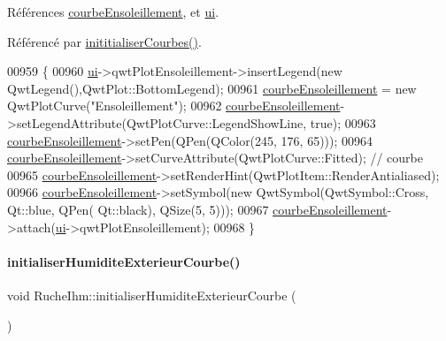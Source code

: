 Références \hyperlink{class_ruche_ihm_af160181f408b3a9519b97e67c810a0fd}{courbe\+Ensoleillement}, et \hyperlink{class_ruche_ihm_a64786058bd7f88ca2f1e9743bb27c25b}{ui}.



Référencé par \hyperlink{class_ruche_ihm_a4fe15b22538611ad9ffc4d807f8b78fd}{inititialiser\+Courbes()}.


\begin{DoxyCode}
00959 \{
00960     \hyperlink{class_ruche_ihm_a64786058bd7f88ca2f1e9743bb27c25b}{ui}->qwtPlotEnsoleillement->insertLegend(\textcolor{keyword}{new} QwtLegend(),QwtPlot::BottomLegend);
00961     \hyperlink{class_ruche_ihm_af160181f408b3a9519b97e67c810a0fd}{courbeEnsoleillement} = \textcolor{keyword}{new} QwtPlotCurve(\textcolor{stringliteral}{"Ensoleillement"});
00962     \hyperlink{class_ruche_ihm_af160181f408b3a9519b97e67c810a0fd}{courbeEnsoleillement}->setLegendAttribute(QwtPlotCurve::LegendShowLine, \textcolor{keyword}{true});
00963     \hyperlink{class_ruche_ihm_af160181f408b3a9519b97e67c810a0fd}{courbeEnsoleillement}->setPen(QPen(QColor(245, 176, 65)));
00964     \hyperlink{class_ruche_ihm_af160181f408b3a9519b97e67c810a0fd}{courbeEnsoleillement}->setCurveAttribute(QwtPlotCurve::Fitted); \textcolor{comment}{// courbe}
00965     \hyperlink{class_ruche_ihm_af160181f408b3a9519b97e67c810a0fd}{courbeEnsoleillement}->setRenderHint(QwtPlotItem::RenderAntialiased);
00966     \hyperlink{class_ruche_ihm_af160181f408b3a9519b97e67c810a0fd}{courbeEnsoleillement}->setSymbol(\textcolor{keyword}{new} QwtSymbol(QwtSymbol::Cross, Qt::blue, QPen(
      Qt::black), QSize(5, 5)));
00967     \hyperlink{class_ruche_ihm_af160181f408b3a9519b97e67c810a0fd}{courbeEnsoleillement}->attach(\hyperlink{class_ruche_ihm_a64786058bd7f88ca2f1e9743bb27c25b}{ui}->qwtPlotEnsoleillement);
00968 \}
\end{DoxyCode}
\mbox{\label{class_ruche_ihm_ab4bca9c5285c1e9added34ba374eaf84}} 
\paragraph{\texorpdfstring{initialiser\+Humidite\+Exterieur\+Courbe()}{initialiserHumiditeExterieurCourbe()}}
{\footnotesize\ttfamily void Ruche\+Ihm\+::initialiser\+Humidite\+Exterieur\+Courbe (\begin{DoxyParamCaption}{ }\end{DoxyParamCaption})\hspace{0.3cm}{\ttfamily [private]}}



